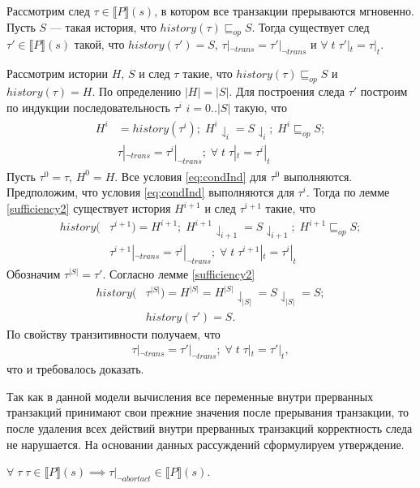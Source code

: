 \begin{lemma}\label{sufficiency3}
Рассмотрим след $\tau \in \llbracket P \rrbracket (s)$, в котором все транзакции прерываются мгновенно. Пусть $S$ --- такая история, что $history(\tau) \sqsubseteq_{op} S$. Тогда существует след $\tau' \in \llbracket P \rrbracket (s)$ такой, что $history(\tau') = S$, $\tau|_{\neg trans} = \tau'|_{\neg trans}$ и $\forall \; t \; \tau'|_t = \tau|_t$. \end{lemma}
\begin{myproof}
Рассмотрим истории $H$, $S$ и след $\tau$ такие, что $history(\tau) \sqsubseteq_{op} S$ и $history(\tau) = H$. По определению $|H| = |S|$. Для построения следа $\tau'$ построим по индукции последовательность $\tau^i$ $i = 0..|S|$ такую, что
\begin{align}\label{eq:condInd}
\begin{split}
H^i &= history(\tau^i); \; H^i \downharpoonleft_{i} = S \downharpoonleft_{i}; \; H^i \sqsubseteq_{op} S; \\
&\tau|_{\neg trans} = \tau^i|_{\neg trans}; \; \forall \; t \; \tau|_{t} = \tau^i|_{t}
\end{split} 
\end{align}
Пусть $\tau^0 = \tau$, $H^0 = H$. Все условия \eqref{eq:condInd} для $\tau^0$ выполняются. Предположим, что условия \eqref{eq:condInd} выполняются для $\tau^i$. Тогда по лемме \ref{sufficiency2} существует история $H^{i+1}$ и след $\tau^{i+1}$ такие, что
\begin{align*}
history(&\tau^{i+1}) = H^{i+1}; \; H^{i+1}\downharpoonleft_{i+1} = S\downharpoonleft_{i+1}; \; H^{i+1} \sqsubseteq_{op} S; \\ 
&\tau^{i+1}|_{\neg trans} = \tau^i|_{\neg trans}; \; \forall \; t \; \tau^{i+1}|_{t} = \tau^i|_{t}
\end{align*}
Обозначим $\tau^{|S|} = \tau'$. Согласно лемме \ref{sufficiency2}
\begin{align*}
history(&\tau^{|S|}) = H^{|S|} = H^{|S|}\downharpoonleft_{|S|} = S\downharpoonleft_{|S|} = S;\\ 
&history(\tau') = S.
\end{align*}
По свойству транзитивности получаем, что 
\begin{align*}
\tau|_{\neg trans} = \tau'|_{\neg trans}; \; \forall \; t \; \tau|_{t} = \tau'|_{t},
\end{align*}
что и требовалось доказать.
\end{myproof}
Так как в данной модели вычисления все переменные внутри прерванных транзакций принимают свои прежние значения после прерывания транзакции, то после удаления всех действий внутри прерванных транзакций корректность следа не нарушается. На основании данных рассуждений сформулируем утверждение.
\begin{mystatement}\label{statement1}
$\forall \; \tau \; \tau \in \llbracket P \rrbracket (s) \implies \tau|_{\neg abortact} \in \llbracket P \rrbracket (s).$
\end{mystatement}

